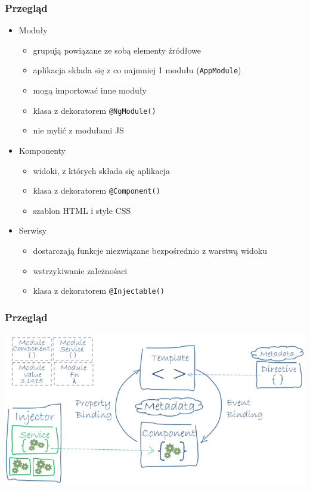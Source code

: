 \documentclass{beamer}
\begin{document}
\begin{frame}
    \frametitle{Przegląd}
    \begin{itemize}
        \item Moduły
            \begin{itemize}
                \item grupują powiązane ze sobą elementy źródłowe
                \item aplikacja składa się z co najmniej 1 modułu (\lstinline{AppModule})
                \item mogą importować inne moduły
                \item klasa z dekoratorem \lstinline{@NgModule()}
                \item nie mylić z modułami JS
            \end{itemize}
        \item Komponenty
            \begin{itemize}
                \item widoki, z których składa się aplikacja
                \item klasa z dekoratorem \lstinline{@Component()}
                \item szablon HTML i style CSS
            \end{itemize}
        \item Serwisy
            \begin{itemize}
                \item dostarczają funkcje niezwiązane bezpośrednio z warstwą widoku
                \item wstrzykiwanie zależnośaci
                \item klasa z dekoratorem \lstinline{@Injectable()}
            \end{itemize}
    \end{itemize}
\end{frame}

\begin{frame}
    \frametitle{Przegląd}
    \begin{center}
	\includegraphics[scale=0.4]{overview2.png}
    \end{center}
\end{frame}
\end{document}
